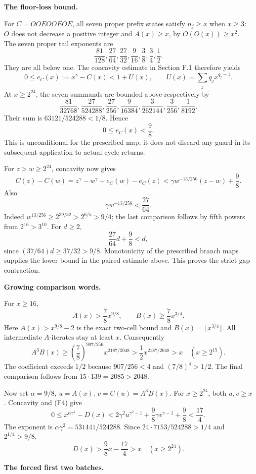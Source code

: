\documentclass[12pt]{article}
\begin{document}
\textbf{The floor-loss bound.}

For \(C=OOEOOEOE\), all seven proper prefix states satisfy \(n_j\ge x\)
when \(x\ge3\): \(O\) does not decrease a positive integer and
\(A(x)\ge x\), by \(O(O(x))\ge x^2\). The seven proper tail exponents
are \[
\frac{81}{128},\frac{27}{64},\frac{27}{32},
\frac9{16},\frac38,\frac34,\frac{1}{2}.
\] They are all below one. The concavity estimate in Section F.1
therefore yields \[
0\le e_C(x):=x^\gamma-C(x)<1+U(x),\qquad
U(x)=\sum_j q_jx^{q_j-1}.
\] At \(x\ge2^{24}\), the seven summands are bounded above respectively
by \[
\frac{81}{32768},\frac{27}{524288},\frac{27}{256},
\frac9{16384},\frac3{262144},\frac3{256},\frac1{8192}.
\] Their sum is \(63121/524288<1/8\). Hence \[
0\le e_C(x)<\frac98. \tag{F4}
\] This is unconditional for the prescribed map; it does not discard any
guard in its subsequent application to actual cycle returns.

For \(z>w\ge2^{24}\), concavity now gives \[
C(z)-C(w)
=z^\gamma-w^\gamma+e_C(w)-e_C(z)
<\gamma w^{-13/256}(z-w)+\frac98.
\] Also \[
\gamma w^{-13/256}<\frac{27}{64}.
\] Indeed \(w^{13/256}\ge2^{39/32}>2^{6/5}>9/4\); the last comparison
follows by fifth powers from \(2^{16}>3^{10}\). For \(d\ge2\), \[
\frac{27}{64}d+\frac98<d,
\] since \((37/64)d\ge37/32>9/8\). Monotonicity of the prescribed branch
maps supplies the lower bound in the paired estimate above. This proves
the strict gap contraction.

\textbf{Growing comparison words.}

For \(x\ge16\), \[
A(x)>\frac78x^{9/8},\qquad B(x)\ge\frac78x^{3/4}.
\] Here \(A(x)>x^{9/8}-2\) is the exact two-cell bound and
\(B(x)=\lfloor x^{3/4}\rfloor\). All intermediate \(A\)-iterates stay at
least \(x\). Consequently \[
A^3B(x)\ge
\left(\frac78\right)^{907/256}x^{2187/2048}
>\frac{1}{2}x^{2187/2048}>x
\quad(x\ge2^{15}).
\tag{F5}
\] The coefficient exceeds \(1/2\) because \(907/256<4\) and
\((7/8)^4>1/2\). The final comparison follows from
\(15\cdot139=2085>2048\).

Now set \(\alpha=9/8\), \(u=A(x)\), \(v=C(u)=A^3B(x)\). For
\(x\ge2^{24}\), both \(u,v\ge x\). Concavity and (F4) give \[
0\le x^{\alpha\gamma^2}-D(x)
<2\gamma^2u^{\gamma^2-1}
 +\frac98\gamma v^{\gamma-1}+\frac98
<\frac{17}{4}.
\] The exponent is \(\alpha\gamma^2=531441/524288\). Since
\(24\cdot7153/524288>1/4\) and \(2^{1/4}>9/8\), \[
D(x)>\frac98x-\frac{17}{4}>x
\quad(x\ge2^{24}).
\tag{F6}
\]

\textbf{The forced first two batches.}
\end{document}
